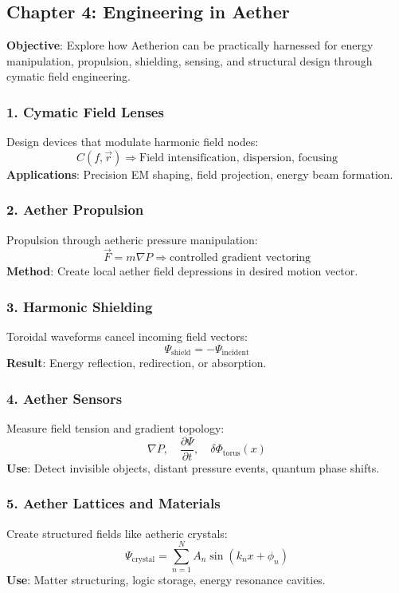 \subsection{Chapter 4: Engineering in Aether}
\textbf{Objective}: Explore how Aetherion can be practically harnessed for energy manipulation, propulsion, shielding, sensing, and structural design through cymatic field engineering.

\subsubsection*{1. Cymatic Field Lenses}
Design devices that modulate harmonic field nodes:
\[
C(f, \vec{r}) \Rightarrow \text{Field intensification, dispersion, focusing}
\]
\textbf{Applications}: Precision EM shaping, field projection, energy beam formation.

\subsubsection*{2. Aether Propulsion}
Propulsion through aetheric pressure manipulation:
\[
\vec{F} = m \nabla P \Rightarrow \text{controlled gradient vectoring}
\]
\textbf{Method}: Create local aether field depressions in desired motion vector.

\subsubsection*{3. Harmonic Shielding}
Toroidal waveforms cancel incoming field vectors:
\[
\Psi_{\text{shield}} = -\Psi_{\text{incident}}
\]
\textbf{Result}: Energy reflection, redirection, or absorption.

\subsubsection*{4. Aether Sensors}
Measure field tension and gradient topology:
\[
\nabla P, \quad \frac{\partial \Psi}{\partial t}, \quad \delta \Phi_{\text{torus}}(x)
\]
\textbf{Use}: Detect invisible objects, distant pressure events, quantum phase shifts.

\subsubsection*{5. Aether Lattices and Materials}
Create structured fields like aetheric crystals:
\[
\Psi_{\text{crystal}} = \sum_{n=1}^N A_n \sin \left( k_n x + \phi_n \right)
\]
\textbf{Use}: Matter structuring, logic storage, energy resonance cavities.

